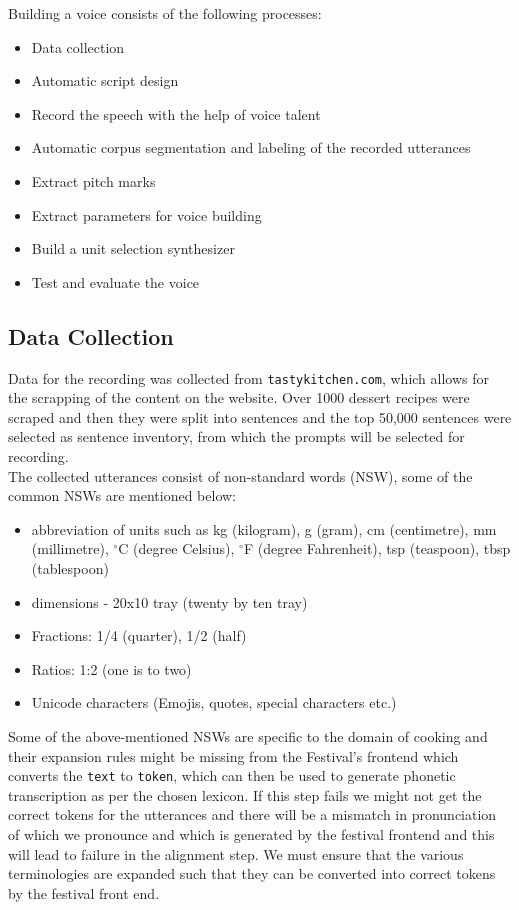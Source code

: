 \documentclass[lettersize,journal]{IEEEtran}
\begin{document}
Building a voice consists of the following processes:
\begin{itemize}
    \item Data collection
    \item Automatic script design
    \item Record the speech with the help of voice talent
    \item Automatic corpus segmentation and labeling of the recorded utterances
    \item Extract pitch marks
    \item Extract parameters for voice building
    \item Build a unit selection synthesizer
    \item Test and evaluate the voice
\end{itemize}


\subsection{Data Collection}

Data for the recording was collected from \verb|tastykitchen.com|, which allows for the scrapping of the content on the website. Over 1000 dessert recipes were scraped and then they were split into sentences and the top 50,000 sentences were selected as sentence inventory, from which the prompts will be selected for recording.
\\
\noindent The collected utterances consist of non-standard words (NSW), some of the common NSWs are mentioned below:
\begin{itemize}
    \item abbreviation of units such as kg (kilogram), g (gram), cm (centimetre), mm (millimetre), $^{\circ}$C (degree Celsius), $^{\circ}$F (degree Fahrenheit), tsp (teaspoon), tbsp (tablespoon) 
    \item dimensions - 20x10 tray (twenty by ten tray)
    \item Fractions: 1/4 (quarter), 1/2 (half)
    \item Ratios: 1:2 (one is to two)
    \item Unicode characters (Emojis, quotes, special characters etc.)
\end{itemize}

\noindent Some of the above-mentioned NSWs are specific to the domain of cooking and their expansion rules might be missing from the Festival's frontend which converts the \verb|text| to \verb|token|, which can then be used to generate phonetic transcription as per the chosen lexicon. If this step fails we might not get the correct tokens for the utterances and there will be a mismatch in pronunciation of which we pronounce and which is generated by the festival frontend and this will lead to failure in the alignment step. We must ensure that the various terminologies are expanded such that they can be converted into correct tokens by the festival front end. 
\end{document}

